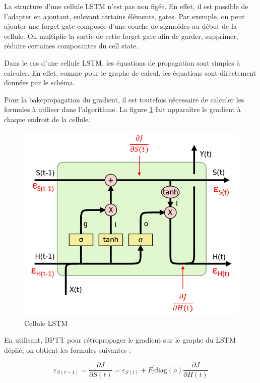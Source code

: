 La structure d'une cellule LSTM n'est pas non figée. En effet, il est possible de l'adapter en ajoutant, enlevant certains éléments, gates. Par exemple, on peut ajouter une forget gate composée d'une couche de sigmoides au début de la cellule. On multiplie la sortie de cette forget gate afin de garder, supprimer, réduire certaines composantes du cell state. 

\break

Dans le cas d'une cellule LSTM, les équations de propagation sont simples à calculer. En effet, comme pour le graphe de calcul, les équations sont directement données par le schéma.

Pour la bakcpropagation du gradient, il est toutefois nécessaire de calculer les formules à utiliser dans l'algorithme. La figure \ref{cellule LSTM gradient} fait apparaître le gradient à chaque endroit de la cellule.

\begin{figure}[h!]
\begin{center}
\includegraphics[scale=0.3]{images/chapter6/LSTM_gradient.png}
\caption{Cellule LSTM}
\label{cellule LSTM gradient}
\end{center}
\end{figure}


En utilisant, BPTT pour rétropropager le gradient sur le graphe du LSTM déplié, on obtient les formules suivantes :

\begin{equation}
\varepsilon_{S(t-1)} = \frac{\partial J}{\partial S(t)} = \varepsilon_{S(t)} + F_{l}^{\prime}\text{diag}(o)\frac{\partial J}{\partial H(t)}
\end{equation}

